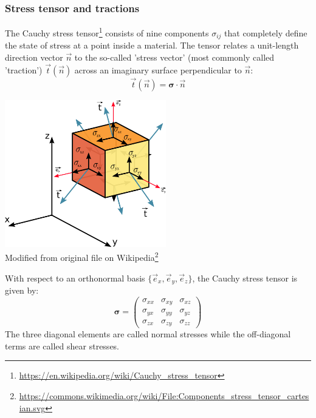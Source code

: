 \subsubsection{Stress tensor and tractions}\label{sec:stresstensor}

The Cauchy stress tensor\footnote{\url{https://en.wikipedia.org/wiki/Cauchy_stress_tensor}} 
consists of nine components $\sigma_{ij}$  that completely define the state of stress 
at a point inside a material. 
The tensor relates a unit-length direction vector $\vec{n}$ to the so-called 'stress vector' (most commonly called 'traction') $\vec{t}(\vec{n})$ across an imaginary surface perpendicular to $\vec{n}$:
\[
\vec{t}(\vec n)= {\bm \sigma}\cdot {\vec n}
\]

\begin{center}
\includegraphics[width=7cm]{images/contmech/Components_stress_tensor_cartesian}\\
{\scriptsize Modified from original 
file on Wikipedia\footnote{\url{https://commons.wikimedia.org/wiki/File:Components_stress_tensor_cartesian.svg}}}
\end{center}

\noindent 
With respect to an orthonormal basis $\{\vec{e}_x,\vec{e}_y,\vec{e}_z\}$, the Cauchy stress tensor
is given by:
\begin{equation}
{\bm \sigma}=
\left(
\begin{array}{ccc}
\sigma_{xx} & \sigma_{xy} & \sigma_{xz} \\
\sigma_{yx} & \sigma_{yy} & \sigma_{yz} \\
\sigma_{zx} & \sigma_{zy} & \sigma_{zz} 
\end{array}
\right)
\end{equation}
The three diagonal elements are called normal stresses while the off-diagonal terms 
are called shear stresses.

